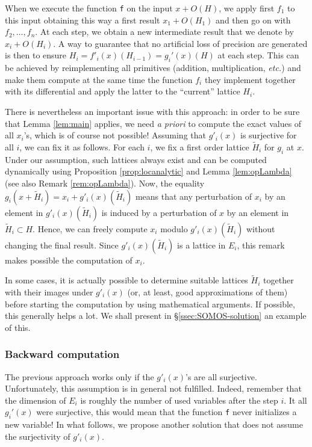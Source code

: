 \documentclass{lms}
\begin{document}
When we execute the function {\tt f} on the input $x + O(H)$, we apply 
first $f_1$ to this input obtaining this way a first result $x_1 + 
O(H_1)$ and then go on with $f_2, \ldots, f_n$. At each step, we obtain 
a new intermediate result that we denote by $x_i + O(H_i)$. A way to 
guarantee that no artificial loss of precision are generated is then to 
ensure $H_i = f'_i(x)(H_{i-1}) = g_i'(x)(H)$ at each step. This can be 
achieved by reimplementing all primitives (addition, multiplication, 
\emph{etc.}) and make them compute at the same time the function $f_i$
they implement together with its differential and apply the latter to
the ``current'' lattice $H_i$.

There is nevertheless an important issue with this approach: in order to 
be sure that Lemma \ref{lem:main} applies, we need \emph{a priori} to 
compute the exact values of all $x_i$'s, which is of course not 
possible! Assuming that $g'_i(x)$ is surjective for all $i$, we can fix 
it as follows. For each $i$, we fix a first order lattice $\tilde H_i$ 
for $g_i$ at $x$. Under our assumption, such lattices always exist and 
can be computed dynamically using Proposition \ref{prop:locanalytic}
and Lemma \ref{lem:opLambda} (see also Remark \ref{rem:opLambda}).
Now, the equality $g_i(x + \tilde H_i) = x_i + g'_i(x)(\tilde H_i)$ 
means that any perturbation of $x_i$ by an element in $g'_i(x) (\tilde 
H_i)$ is induced by a perturbation of $x$ by an element in $\tilde H_i 
\subset H$. Hence, we can freely compute $x_i$ modulo $g'_i(x) (\tilde 
H_i)$ without changing the final result. Since $g'_i(x)(\tilde H_i)$ is 
a lattice in $E_i$, this remark makes possible the computation of $x_i$.

\begin{rmk}
In some cases, it is actually possible to determine suitable lattices 
$\tilde H_i$ together with their images under $g'_i(x)$ (or, at
least, good approximations of them) before starting the computation 
by using mathematical arguments. If possible, this generally helps a
lot. We shall present in \S \ref{ssec:SOMOS-solution} an example of 
this.
\end{rmk}

\subsubsection*{Backward computation}

The previous approach works only if the $g'_i(x)$'s are all surjective. 
Unfortunately, this assumption is in general not fulfilled. Indeed, 
remember that the dimension of $E_i$ is roughly the number of used 
variables after the step $i$. It all $g_i'(x)$ were surjective, this 
would mean that the function {\tt f} never initializes a new variable!
In what follows, we propose another solution that does not assume the
surjectivity of $g'_i(x)$.
\end{document}
